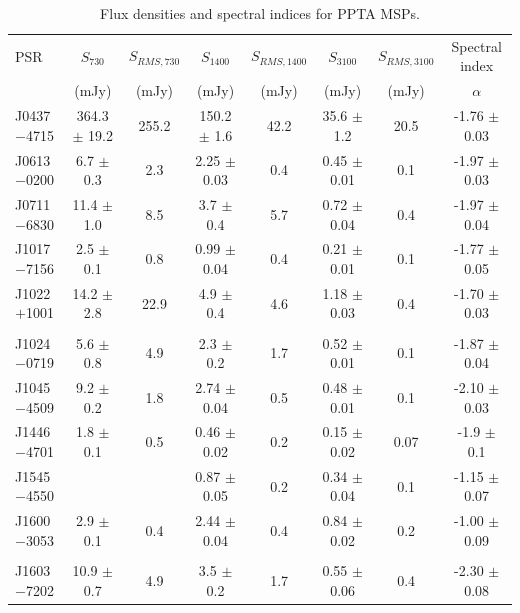 \documentclass[useAMS,usenatbib]{mn2e}
\begin{document}
\begin{table}
\centering
\caption{Flux densities and spectral indices for PPTA MSPs.}
\label{tableFlux}
\begin{tabular}{lccccccc}
\hline
PSR              &    $S_{730}$   &   $S_{RMS,730}$  &    $S_{1400}$    &   $S_{RMS,1400}$  &    $S_{3100}$    &   $S_{RMS,3100}$  & Spectral index \\
								 &     (mJy)      &      (mJy)       &     (mJy)        &      (mJy)       &      (mJy)       &      (mJy)       &     $\alpha$   \\
\hline
 J0437$-$4715  &  364.3 $\pm$ 19.2 &  255.2 &  150.2 $\pm$ 1.6  &  42.2 &  35.6 $\pm$ 1.2  &  20.5 &  -1.76 $\pm$ 0.03  \\
 J0613$-$0200  &  6.7   $\pm$ 0.3  &  2.3   &  2.25  $\pm$ 0.03 &  0.4  &  0.45 $\pm$ 0.01 &  0.1  &  -1.97 $\pm$ 0.03   \\
 J0711$-$6830  &  11.4  $\pm$ 1.0  &  8.5   &  3.7   $\pm$ 0.4  &  5.7  &  0.72 $\pm$ 0.04 &  0.4  &  -1.97 $\pm$ 0.04   \\
 J1017$-$7156  &  2.5   $\pm$ 0.1  &  0.8   &  0.99  $\pm$ 0.04 &  0.4  &  0.21 $\pm$ 0.01 &  0.1  &  -1.77 $\pm$ 0.05  \\
 J1022$+$1001  &  14.2  $\pm$ 2.8  &  22.9  &  4.9   $\pm$ 0.4  &  4.6  &  1.18 $\pm$ 0.03 &  0.4  &  -1.70 $\pm$ 0.03   \\
               &	                 &        &                   &       &                  &       &                    \\
 J1024$-$0719  &  5.6   $\pm$ 0.8  &  4.9   &  2.3   $\pm$ 0.2  &  1.7  &  0.52 $\pm$ 0.01 &  0.1  &  -1.87 $\pm$ 0.04  \\
 J1045$-$4509  &  9.2   $\pm$ 0.2  &  1.8   &  2.74  $\pm$ 0.04 &  0.5  &  0.48 $\pm$ 0.01 &  0.1  &  -2.10 $\pm$ 0.03   \\
 J1446$-$4701  &  1.8   $\pm$ 0.1  &  0.5   &  0.46  $\pm$ 0.02 &  0.2  &  0.15 $\pm$ 0.02 &  0.07 &  -1.9  $\pm$ 0.1   \\
 J1545$-$4550  &                   &        &  0.87  $\pm$ 0.05 & 0.2   &  0.34 $\pm$ 0.04 & 0.1   &  -1.15 $\pm$ 0.07 \\
 J1600$-$3053  &  2.9   $\pm$ 0.1  &  0.4   &  2.44  $\pm$ 0.04 &  0.4  &  0.84 $\pm$ 0.02 &  0.2  &  -1.00 $\pm$ 0.09  \\
               &	                 &        &                   &       &                  &       &                    \\
 J1603$-$7202  &  10.9  $\pm$ 0.7  &  4.9   &  3.5   $\pm$ 0.2  &  1.7  &  0.55 $\pm$ 0.06 &  0.4  &  -2.30 $\pm$ 0.08  \\

\end{tabular}
\end{table}
\end{document}
